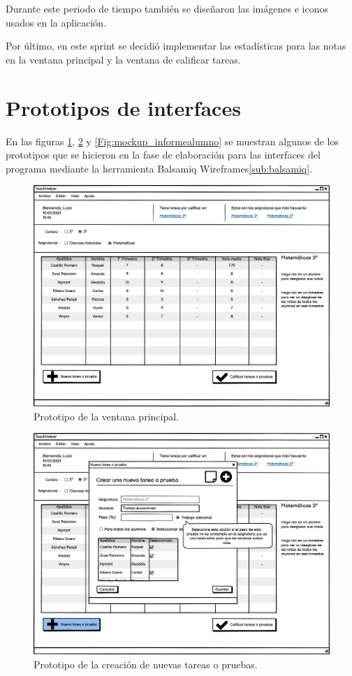 Durante este periodo de tiempo también se diseñaron las imágenes e iconos usados en la aplicación.

Por último, en este sprint se decidió implementar las estadísticas para las notas en la ventana principal y la ventana de calificar tareas.

	
\section{Prototipos de interfaces}
\label{sec:prototipos}
En las figuras \ref{Fig:mockup_mainwindow}, \ref{Fig:mockup_nuevatarea} y \ref{Fig:mockup_informealumno} se muestran algunos de los prototipos que se hicieron en la fase de elaboración para las interfaces del programa mediante la herramienta Balsamiq Wireframes\ref{sub:balsamiq}.

\begin{figure}[h]
\centering\includegraphics[width=1\linewidth]{figs/mockup_mainwindow.png}
\caption{Prototipo de la ventana principal.}
\label{Fig:mockup_mainwindow}
\end{figure}

\begin{figure}[h]
\centering\includegraphics[width=1\linewidth]{figs/mockup_nuevatarea.png}
\caption{Prototipo de la creación de nuevas tareas o pruebas.}
\label{Fig:mockup_nuevatarea}
\end{figure}

